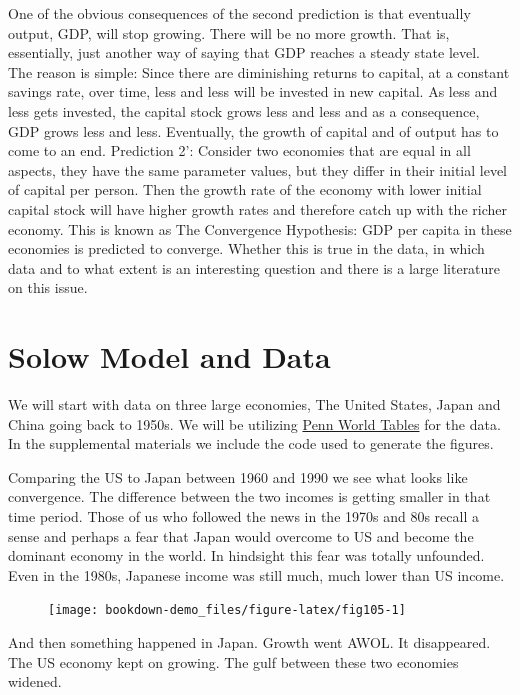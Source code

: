\documentclass[
]{book}
\begin{document}
One of the obvious consequences of the second prediction is that eventually output, GDP, will stop growing. There will be no more growth. That is, essentially, just another way of saying that GDP reaches a steady state level.\\
The reason is simple: Since there are diminishing returns to capital, at a constant savings rate, over time, less and less will be invested in new capital. As less and less gets invested, the capital stock grows less and less and as a consequence, GDP grows less and less. Eventually, the growth of capital and of output has to come to an end.
Prediction 2': Consider two economies that are equal in all aspects, they have the same parameter values, but they differ in their initial level of capital per person. Then the growth rate of the economy with lower initial capital stock will have higher growth rates and therefore catch up with the richer economy.
This is known as The Convergence Hypothesis: GDP per capita in these economies is predicted to converge. Whether this is true in the data, in which data and to what extent is an interesting question and there is a large literature on this issue.

\hypertarget{solow-model-and-data}{%
\section{Solow Model and Data}\label{solow-model-and-data}}

We will start with data on three large economies, The United States, Japan and China going back to 1950s. We will be utilizing \href{https://www.rug.nl/ggdc/productivity/pwt/?lang=en}{Penn World Tables} for the data. In the supplemental materials we include the code used to generate the figures.

Comparing the US to Japan between 1960 and 1990 we see what looks like convergence. The difference between the two incomes is getting smaller in that time period. Those of us who followed the news in the 1970s and 80s recall a sense and perhaps a fear that Japan would overcome to US and become the dominant economy in the world. In hindsight this fear was totally unfounded. Even in the 1980s, Japanese income was still much, much lower than US income.

\begin{figure}
\texttt{[image: bookdown-demo\_files/figure-latex/fig105-1]} \end{figure}

And then something happened in Japan. Growth went AWOL. It disappeared. The US economy kept on growing. The gulf between these two economies widened.
\end{document}
